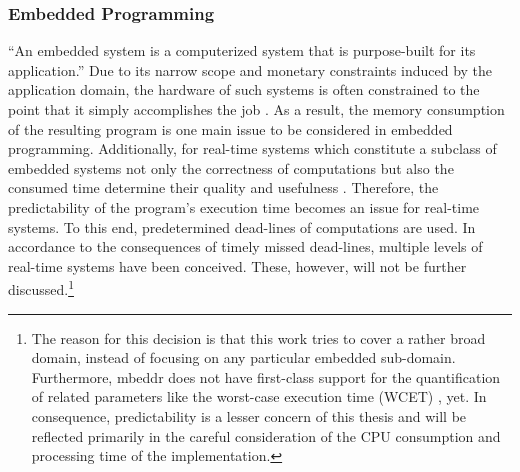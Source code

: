 \subsubsection{Embedded Programming}
``An embedded system is a computerized system that is purpose-built for its application.'' \cite[p.~1]{MakingEmbeddedSystems} Due to its narrow scope and monetary constraints induced by the application domain, the hardware of such systems is often constrained to the point that it simply accomplishes the job \cite{MakingEmbeddedSystems}. As a result, the memory consumption of the resulting program is one main issue to be considered in embedded programming. Additionally, for real-time systems which constitute a subclass of embedded systems not only the correctness of computations but also the consumed time determine their quality and usefulness \cite[pp.~1-2]{SoftReal-TimeSystems}. Therefore, the predictability of the program's execution time becomes an issue for real-time systems. To this end, predetermined dead-lines of computations are used. In accordance to the consequences of timely missed dead-lines, multiple levels of real-time systems have been conceived. These, however, will not be further discussed.\footnote{The reason for this decision is that this work tries to cover a rather broad domain, instead of focusing on any particular embedded sub-domain. Furthermore, mbeddr does not have first-class support for the quantification of related parameters like the worst-case execution time (WCET) \cite[p.~8]{SoftReal-TimeSystems}, yet. In consequence, predictability is a lesser concern of this thesis and will be reflected primarily in the careful consideration of the CPU consumption and processing time of the implementation.}

